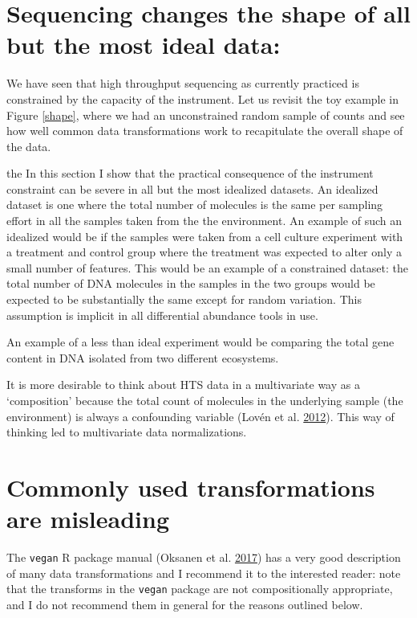 \documentclass[onecolumn]{book}
\theoremstyle{definition}
\theoremstyle{definition}
\theoremstyle{definition}
\theoremstyle{remark}
\begin{document}
\hypertarget{sequencing-changes-the-shape-of-all-but-the-most-ideal-data}{%
\section{Sequencing changes the shape of all but the most ideal
data:}\label{sequencing-changes-the-shape-of-all-but-the-most-ideal-data}}

We have seen that high throughput sequencing as currently practiced is
constrained by the capacity of the instrument. Let us revisit the toy
example in Figure \ref{shape}, where we had an unconstrained random
sample of counts and see how well common data transformations work to
recapitulate the overall shape of the data.

the In this section I show that the practical consequence of the
instrument constraint can be severe in all but the most idealized
datasets. An idealized dataset is one where the total number of
molecules is the same per sampling effort in all the samples taken from
the the environment. An example of such an idealized would be if the
samples were taken from a cell culture experiment with a treatment and
control group where the treatment was expected to alter only a small
number of features. This would be an example of a constrained dataset:
the total number of DNA molecules in the samples in the two groups would
be expected to be substantially the same except for random variation.
This assumption is implicit in all differential abundance tools in use.

An example of a less than ideal experiment would be comparing the total
gene content in DNA isolated from two different ecosystems.

It is more desirable to think about HTS data in a multivariate way as a
`composition' because the total count of molecules in the underlying
sample (the environment) is always a confounding variable (Lovén et al.
\protect\hyperlink{ref-Loven:2012aa}{2012}). This way of thinking led to
multivariate data normalizations.

\hypertarget{commonly-used-transformations-are-misleading}{%
\section{Commonly used transformations are
misleading}\label{commonly-used-transformations-are-misleading}}

The \texttt{vegan} R package manual (Oksanen et al.
\protect\hyperlink{ref-vegan:2017}{2017}) has a very good description of
many data transformations and I recommend it to the interested reader:
note that the transforms in the \texttt{vegan} package are not
compositionally appropriate, and I do not recommend them in general for
the reasons outlined below.
\end{document}
